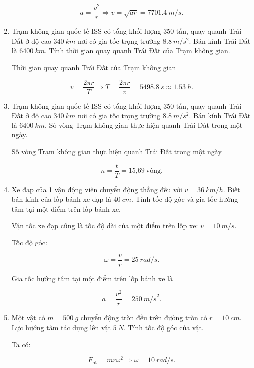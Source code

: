 \begin{enumerate}[label=\bfseries Câu \arabic*:]
{			$$a = \dfrac{v^2}{r} \Rightarrow v = \sqrt{ar} = \SI{7701,4}{m/s}.$$
			
		}
		\item {}
		
		
		{
			Trạm không gian quốc tế ISS có tổng khối lượng 350 tấn, quay quanh Trái Đất ở độ cao $\SI{340}{km}$ nơi có gia tốc trọng trường $\SI{8,8}{m/s^2}$. Bán kính Trái Đất là $\SI{6400}{km}$. Tính thời gian quay quanh Trái Đất của Trạm không gian.
		}
		
		\hideall
		{	
			
			Thời gian quay quanh Trái Đất của Trạm không gian
			
			$$v = \dfrac{2\pi r}{T} \Rightarrow T = \dfrac{2\pi r}{v} = \SI{5498,8}{s} \approx \SI{1,53}{h}.$$
			
		}
		\item {}
		
		
		{
			Trạm không gian quốc tế ISS có tổng khối lượng 350 tấn, quay quanh Trái Đất ở độ cao $\SI{340}{km}$ nơi có gia tốc trọng trường $\SI{8,8}{m/s^2}$. Bán kính Trái Đất là $\SI{6400}{km}$. Số vòng Trạm không gian thực hiện quanh Trái Đất trong một ngày.
		}
		
		\hideall
		{	
			
			Số vòng Trạm không gian thực hiện quanh Trái Đất trong một ngày
			
			$$n = \dfrac{t}{T} = \text{15,69}\ \text{vòng}.$$
			
		}
		\item {}
		
		
		{
			Xe đạp của 1 vận động viên chuyển động thẳng đều với $v = \SI{36}{km/h}$. Biết bán kính của lốp bánh xe đạp là $\SI{40}{cm}$. Tính tốc độ góc và gia tốc hướng tâm tại một điểm trên lốp bánh xe.
		}
		
		\hideall
		{	
			
			Vận tốc xe đạp cũng là tốc độ dài của một điểm trên lốp xe: $v = \SI{10}{m/s}.$
			
			Tốc độ góc:
			
			$$\omega = \dfrac{v}{r} = \SI{25}{rad/s}.$$
			
			Gia tốc hướng tâm tại một điểm trên lốp bánh xe là
			
			$$a = \dfrac{v^2}{r} = \SI{250}{m/s}^2.$$
			
		}
		\item {}
		
		
		{
			Một vật có $m = \SI{500}{g}$ chuyển động tròn đều trên đường tròn có $r = \SI{10}{cm}$. Lực hướng tâm tác dụng lên vật $\SI{5}{N}$. Tính tốc độ góc của vật.
		}
		
		\hideall
		{	
			
			Ta có: 
			
			$$F_\text{ht} = mr\omega^2 \Rightarrow \omega = \SI{10}{rad/s}.$$
			
		}
\end{enumerate}